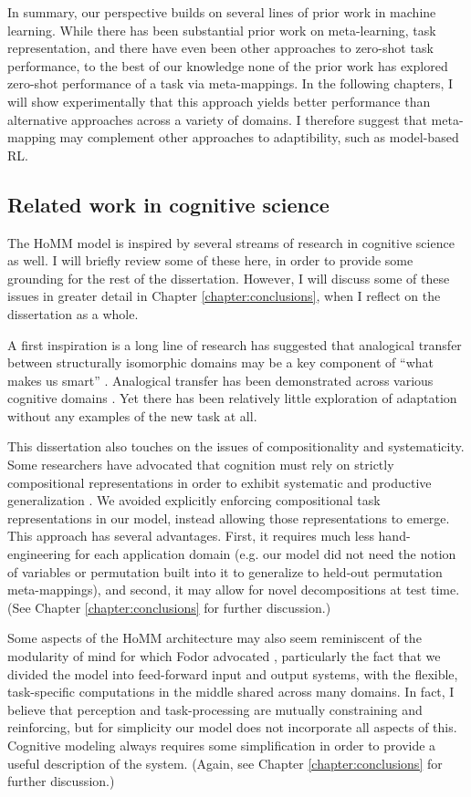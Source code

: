 In summary, our perspective builds on several lines of prior work in machine learning. While there has been substantial prior work on meta-learning, task representation, and there have even been other approaches to zero-shot task performance, to the best of our knowledge none of the prior work has explored zero-shot performance of a task via meta-mappings. In the following chapters, I will show experimentally that this approach yields better performance than alternative approaches across a variety of domains. I therefore suggest that meta-mapping may complement other approaches to adaptibility, such as model-based RL.

\subsection{Related work in cognitive science}
The HoMM model is inspired by several streams of research in cognitive science as well. I will briefly review some of these here, in order to provide some grounding for the rest of the dissertation. However, I will discuss some of these issues in greater detail in Chapter \ref{chapter:conclusions}, when I reflect on the dissertation as a whole.   

A first inspiration is a long line of research has suggested that analogical transfer between structurally isomorphic domains may be a key component of ``what makes us smart'' \citep{Gentner2003}. Analogical transfer has been demonstrated across various cognitive domains \citep[e.g.][]{Bourne1970, Day2011}. Yet there has been relatively little exploration of adaptation without any examples of the new task at all. 

This dissertation also touches on the issues of compositionality and systematicity. Some researchers have advocated that cognition must rely on strictly compositional representations in order to exhibit systematic and productive generalization \citep[e.g.][]{Fodor2001,Lake2017}.  We avoided explicitly enforcing compositional task representations in our model, instead allowing those representations to emerge. This approach has several advantages. First, it requires much less hand-engineering for each application domain (e.g. our model did not need the notion of variables or permutation built into it to generalize to held-out permutation meta-mappings), and second, it may allow for novel decompositions at test time. (See Chapter \ref{chapter:conclusions} for further discussion.) 

Some aspects of the HoMM architecture may also seem reminiscent of the modularity of mind for which Fodor advocated \citep{Fodor1983modularity}, particularly the fact that we divided the model into feed-forward input and output systems, with the flexible, task-specific computations in the middle shared across many domains. In fact, I believe that perception and task-processing are mutually constraining and reinforcing, but for simplicity our model does not incorporate all aspects of this. Cognitive modeling always requires some simplification in order to provide a useful description of the system. (Again, see Chapter \ref{chapter:conclusions} for further discussion.)   

